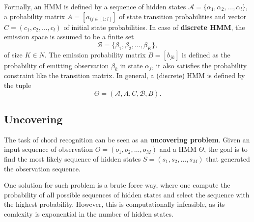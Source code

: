 \documentclass[a4paper, 9pt, twocolumn]{extarticle}
\begin{document}
Formally, an HMM is defined by
a sequence of hidden states $\mathcal{A} = \{\alpha_1, \alpha_2, \ldots, \alpha_l\}$, a probability matrix $A = [a_{ij\in [1:l]}]$ of state transition probabilities and vector $C = (c_1, c_2, \ldots, c_l)$ of initial state probabilities.
In case of \textbf{discrete HMM}, the emission space is assumed to be a finite set
\begin{equation}
    \mathcal{B} = \{\beta_1, \beta_2, \ldots, \beta_K\},
\end{equation}
of size $K \in N$. The emission probability matrix $B = [b_{jk}]$ is defined as the probability of emitting observation $\beta_k$ in state $\alpha_j$, it also satisfies the probability constraint like the transition matrix.
In general, a (discrete) HMM is defined by the tuple
\begin{equation}
    \Theta = (\mathcal{A}, A, C, \mathcal{B}, B).
\end{equation}

\subsection{Uncovering}
\label{subsection:implementation}
The task of chord recognition can be seen as an \textbf{uncovering problem}.
Given an input sequence of observation $O = (o_1, o_2, \ldots, o_M)$ and a HMM $\Theta$, the goal is to find the most likely sequence of hidden states $S = (s_1, s_2, \ldots, s_M)$ that generated the observation sequence.

One solution for such problem is a brute force way, where one compute the probability of all possible sequences of hidden states and select the sequence with the highest probability. However, this is computationally infeasible, as its comlexity is exponential in the number of hidden states.
\end{document}

